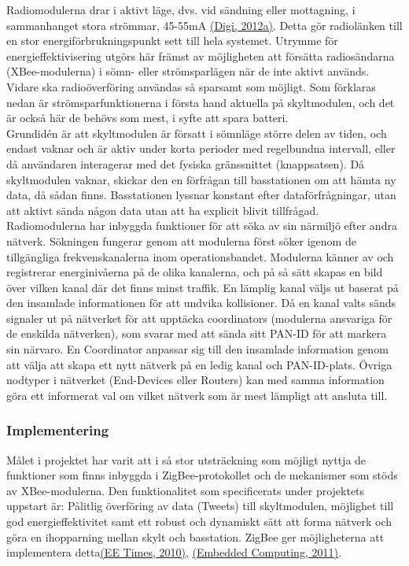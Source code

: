 \documentclass[a4paper,11pt]{article}
\begin{document}
Radiomodulerna drar i aktivt läge, dvs. vid sändning eller mottagning, i sammanhanget stora strömmar, 45-55mA \hyperref[digi]{(Digi, 2012a)}. Detta gör radiolänken till en stor energiförbrukningspunkt sett till hela systemet. Utrymme för energieffektivisering utgörs här främst av möjligheten att försätta radiosändarna (XBee-modulerna) i sömn- eller strömsparlägen när de inte aktivt används. Vidare ska radioöverföring användas så sparsamt som möjligt. Som förklaras nedan är strömsparfunktionerna i första hand aktuella på skyltmodulen, och det är också här de behövs som mest, i syfte att spara batteri. \\

Grundidén är att skyltmodulen är försatt i sömnläge större delen av tiden, och endast vaknar och är aktiv under korta perioder med regelbundna intervall, eller då användaren interagerar med det fysiska gränssnittet (knappsatsen). Då skyltmodulen vaknar, skickar den en förfrågan till basstationen om att hämta ny data, då sådan finns. Basstationen lyssnar konstant efter dataförfrågningar, utan att aktivt sända någon data utan att ha explicit blivit tillfrågad. \\

Radiomodulerna har inbyggda funktioner för att söka av sin närmiljö efter andra nätverk. Sökningen fungerar genom att modulerna först söker igenom de tillgängliga frekvenskanalerna inom operationsbandet. Modulerna känner av och registrerar energinivåerna på de olika kanalerna, och på så sätt skapas en bild över vilken kanal där det finns minst traffik. En lämplig kanal väljs ut baserat på den insamlade informationen för att undvika kollisioner. Då en kanal valts sänds signaler ut på nätverket för att upptäcka coordinators (modulerna ansvariga för de enskilda nätverken), som svarar med att sända sitt PAN-ID för att markera sin närvaro. En Coordinator anpassar sig till den insamlade information genom att välja att skapa ett nytt nätverk på en ledig kanal och PAN-ID-plats. Övriga nodtyper i nätverket (End-Devices eller Routers) kan med samma information göra ett informerat val om vilket nätverk som är mest lämpligt att ansluta till.

\subsubsection{Implementering}
Målet i projektet har varit att i så stor utsträckning som möjligt nyttja de funktioner som finns inbyggda i ZigBee-protokollet och de mekanismer som stöds av XBee-modulerna.
Den funktionalitet som specificerats under projektets uppstart är: Pålitlig överföring av data (Tweets) till skyltmodulen, möjlighet till god energieffektivitet samt ett robust och dynamiskt sätt att forma nätverk och göra en ihopparning mellan skylt och basstation. ZigBee ger möjligheterna att implementera detta\hyperref[eetimes]{(EE Times, 2010)},  \hyperref[embedded]{(Embedded Computing, 2011)}. \\
\end{document}

